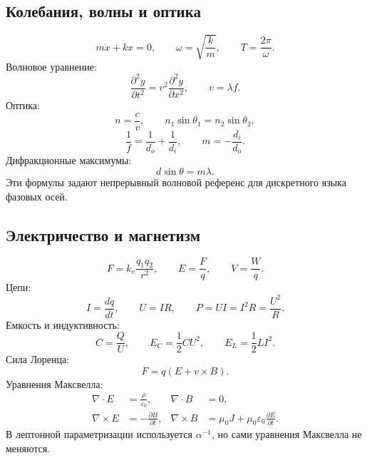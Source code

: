 \documentclass[11pt]{article}
\begin{document}
\subsection{Колебания, волны и оптика}

\begin{equation}
    m\ddot{x}+kx=0,\qquad
    \omega=\sqrt{\frac{k}{m}},\qquad
    T=\frac{2\pi}{\omega}.
\end{equation}
Волновое уравнение:
\begin{equation}
    \frac{\partial^2 y}{\partial t^2}
    =
    v^2\frac{\partial^2 y}{\partial x^2},
    \qquad
    v=\lambda f.
\end{equation}
Оптика:
\begin{equation}
    n=\frac{c}{v},\qquad
    n_1\sin\theta_1=n_2\sin\theta_2,
\end{equation}
\begin{equation}
    \frac{1}{f}=\frac{1}{d_o}+\frac{1}{d_i},
    \qquad
    m=-\frac{d_i}{d_o}.
\end{equation}
Дифракционные максимумы:
\begin{equation}
    d\sin\theta=m\lambda.
\end{equation}
Эти формулы задают непрерывный волновой референс для дискретного языка фазовых
осей.

\subsection{Электричество и магнетизм}

\begin{equation}
    F=k_e\frac{q_1q_2}{r^2},\qquad
    E=\frac{F}{q},\qquad
    V=\frac{W}{q}.
\end{equation}
Цепи:
\begin{equation}
    I=\frac{dq}{dt},\qquad
    U=IR,\qquad
    P=UI=I^2R=\frac{U^2}{R}.
\end{equation}
Емкость и индуктивность:
\begin{equation}
    C=\frac{Q}{U},\qquad
    E_C=\frac{1}{2}CU^2,\qquad
    E_L=\frac{1}{2}LI^2.
\end{equation}
Сила Лоренца:
\begin{equation}
    F=q(E+v\times B).
\end{equation}
Уравнения Максвелла:
\begin{align}
    \nabla\cdot E&=\frac{\rho}{\varepsilon_0},&
    \nabla\cdot B&=0,\\
    \nabla\times E&=-\frac{\partial B}{\partial t},&
    \nabla\times B&=\mu_0J+\mu_0\varepsilon_0\frac{\partial E}{\partial t}.
\end{align}
В лептонной параметризации используется $\alpha^{-1}$, но сами уравнения
Максвелла не меняются.
\end{document}
